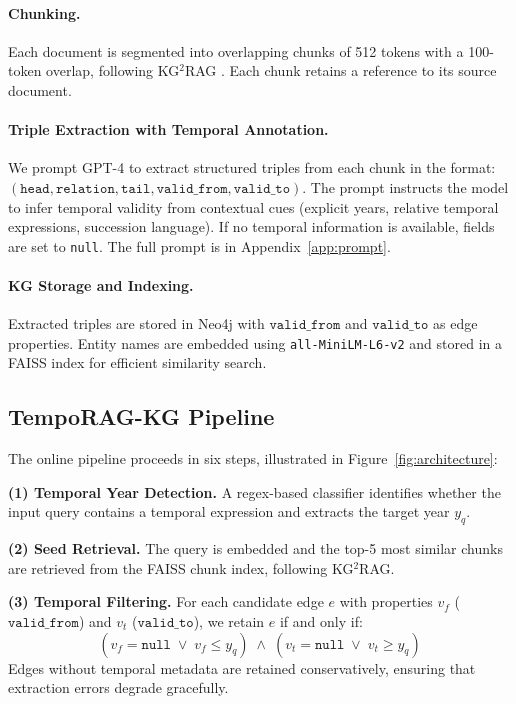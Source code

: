 \documentclass[11pt]{article}
\begin{document}
\paragraph{Chunking.}
Each document is segmented into overlapping chunks of 512 tokens with a
100-token overlap, following KG$^2$RAG \cite{zhu2025kg2rag}. Each chunk
retains a reference to its source document.

\paragraph{Triple Extraction with Temporal Annotation.}
We prompt GPT-4 to extract structured triples from each chunk in the
format: $(\mathtt{head}, \mathtt{relation}, \mathtt{tail},
\mathtt{valid\_from}, \mathtt{valid\_to})$. The prompt instructs the model
to infer temporal validity from contextual cues (explicit years, relative
temporal expressions, succession language). If no temporal information is
available, fields are set to \texttt{null}. The full prompt is in
Appendix~\ref{app:prompt}.

\paragraph{KG Storage and Indexing.}
Extracted triples are stored in Neo4j with $\mathtt{valid\_from}$ and
$\mathtt{valid\_to}$ as edge properties. Entity names are embedded using
\texttt{all-MiniLM-L6-v2} \cite{reimers2019sentencebert} and stored in a
FAISS index for efficient similarity search.

\subsection{TempoRAG-KG Pipeline}

The online pipeline proceeds in six steps, illustrated in
Figure~\ref{fig:architecture}:

\textbf{(1) Temporal Year Detection.}
A regex-based classifier identifies whether the input query contains a
temporal expression and extracts the target year $y_q$.

\textbf{(2) Seed Retrieval.}
The query is embedded and the top-5 most similar chunks are retrieved
from the FAISS chunk index, following KG$^2$RAG.

\textbf{(3) Temporal Filtering.}
For each candidate edge $e$ with properties $v_f$ ($\mathtt{valid\_from}$)
and $v_t$ ($\mathtt{valid\_to}$), we retain $e$ if and only if:
\begin{equation}
  (v_f = \texttt{null} \;\lor\; v_f \leq y_q) \;\land\;
  (v_t = \texttt{null} \;\lor\; v_t \geq y_q)
  \label{eq:filter}
\end{equation}
Edges without temporal metadata are retained conservatively, ensuring
that extraction errors degrade gracefully.
\end{document}
